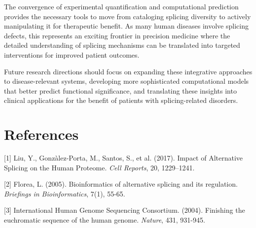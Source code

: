 \documentclass[12pt,a4paper]{article}
\begin{document}
The convergence of experimental quantification and computational prediction provides the necessary tools to move from cataloging splicing diversity to actively manipulating it for therapeutic benefit. As many human diseases involve splicing defects, this represents an exciting frontier in precision medicine where the detailed understanding of splicing mechanisms can be translated into targeted interventions for improved patient outcomes.

Future research directions should focus on expanding these integrative approaches to disease-relevant systems, developing more sophisticated computational models that better predict functional significance, and translating these insights into clinical applications for the benefit of patients with splicing-related disorders.

\section{References}

[1] Liu, Y., Gonzàlez-Porta, M., Santos, S., et al. (2017). Impact of Alternative Splicing on the Human Proteome. \textit{Cell Reports}, 20, 1229–1241.

[2] Florea, L. (2005). Bioinformatics of alternative splicing and its regulation. \textit{Briefings in Bioinformatics}, 7(1), 55-65.

[3] International Human Genome Sequencing Consortium. (2004). Finishing the euchromatic sequence of the human genome. \textit{Nature}, 431, 931-945.
\end{document}
